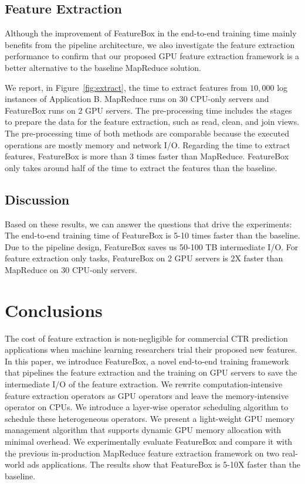 \documentclass[sigconf]{acmart}
\begin{document}
\subsection{Feature Extraction}
Although the improvement of FeatureBox in the end-to-end training time mainly benefits from the pipeline architecture, we also investigate the feature extraction performance to confirm that our proposed GPU feature extraction framework is a better alternative to the baseline MapReduce solution. 

We report, in Figure~\ref{fig:extract}, the time to extract features from $10,000$ log instances of Application B. MapReduce runs on 30 CPU-only servers and FeatureBox runs on 2 GPU servers. The pre-processing time includes the stages to prepare the data for the feature extraction, such as read, clean, and join views. The pre-processing time of both methods are comparable because the executed operations are mostly memory and network I/O. Regarding the time to extract features, FeatureBox is more than 3 times faster than MapReduce. FeatureBox only takes around half of the time to extract the features than the baseline.

\subsection{Discussion}
Based on these results, we can answer the questions that drive the experiments: The end-to-end training time of FeatureBox is 5-10 times faster than the baseline. Due to the pipeline design, FeatureBox saves us 50-100 TB intermediate I/O. For feature extraction only tasks, FeatureBox on 2 GPU servers is 2X faster than MapReduce on 30 CPU-only servers.


\section{Conclusions}
The cost of feature extraction is non-negligible for commercial CTR prediction applications when machine learning researchers trial their proposed new features. In this paper, we introduce FeatureBox, a novel end-to-end training framework that pipelines the feature extraction and the training on GPU servers to save the intermediate I/O of the feature extraction. We rewrite computation-intensive feature extraction operators as GPU operators and leave the memory-intensive operator on CPUs. We introduce a layer-wise operator scheduling algorithm to schedule these heterogeneous operators. We present a light-weight GPU memory management algorithm that supports dynamic GPU memory allocation with minimal overhead. We experimentally evaluate FeatureBox and compare it with the previous in-production MapReduce feature extraction framework on two real-world ads applications. The results show that FeatureBox is 5-10X faster than the baseline.


\clearpage


\end{document}
